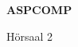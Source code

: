 \documentclass[a4paper]{article}
\begin{document}
\printGenericVSLHeader
\begin{center}
\begin{vsltext}{3cm}{4cm}

    \textbf{ASPCOMP} 

    \vspace{1cm}

    Hörsaal 2

\end{vsltext}

\end{center}
\end{document}

